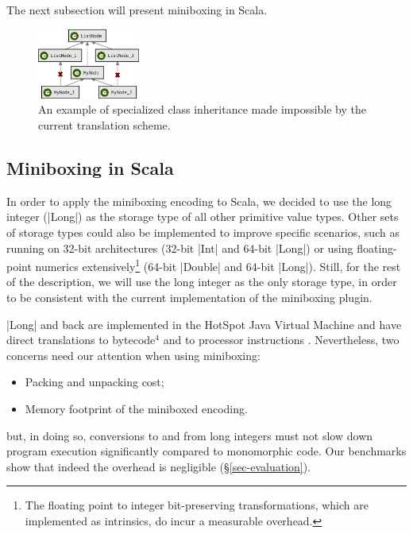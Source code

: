 The next subsection will present miniboxing in Scala.

\begin{figure}[t]
    \centering
    \includegraphics[width=0.30\textwidth]{diags/spec-multi.eps}

    \caption{An example of specialized class inheritance made impossible by the current translation scheme.}
    \label{fig-spec-multi}

\end{figure}

\subsection{Miniboxing in Scala}

In order to apply the miniboxing encoding to Scala, we decided to use the long integer (|Long|) as the storage type of all other primitive value types. Other sets of storage types could also be implemented to improve specific scenarios, such as running on 32-bit architectures (32-bit |Int| and 64-bit |Long|) or using floating-point numerics extensively\footnote{The floating point to integer bit-preserving transformations, which are implemented as intrinsics, do incur a measurable overhead.} (64-bit |Double| and 64-bit |Long|). Still, for the rest of the description, we will use the long integer as the only storage type, in order to be consistent with the current implementation of the miniboxing plugin.

 |Long| and back are implemented in the HotSpot Java Virtual Machine and have direct translations to bytecode$^\text{4}$ and to processor instructions \cite{intel-ia-32-instruction-reference}. Nevertheless, two concerns need our attention when using miniboxing: %
\begin{itemize}
\item Packing and unpacking cost;
\item Memory footprint of the miniboxed encoding.
\end{itemize}

 but, in doing so, conversions to and from long integers must not slow down program execution significantly compared to monomorphic code. Our benchmarks show that indeed the overhead is negligible (\S{}\ref{sec-evaluation}).

